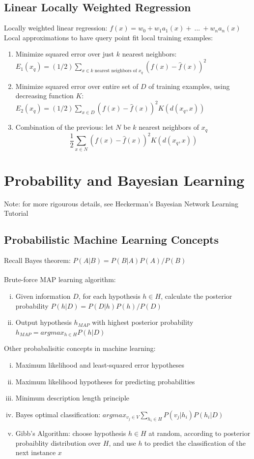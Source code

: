 \documentclass{article}
\begin{document}
		\subsection{Linear Locally Weighted Regression}
			Locally weighted linear regression: $f(x) = w_0 + w_1a_1(x) +\:...\:+ w_na_n(x)$ \\
			Local approximations to have query point fit local training examples:
			\begin{enumerate}
				\item Minimize squared error over just $k$ nearest neighbors: \\
				$E_1(x_q) = (1/2)\sum_{x \in k\text{ nearest neighbors of }x_q} (f(x) - \hat{f}(x))^2$
				\item Minimize squared error over entire set of $D$ of training examples, using decreasing function $K$: \\
				$E_2(x_q) = (1/2)\sum_{x \in D} (f(x) - \hat{f}(x))^2 K(d(x_q, x))$
				\item Combination of the previous: let $N$ be $k$ nearest neighbors of $x_q$
				\begin{equation*}
					\frac{1}{2}\sum_{x \in N} (f(x) - \hat{f}(x))^2 K(d(x_q, x))
					\end{equation*}
				\end{enumerate}
		\clearpage

	\section{Probability and Bayesian Learning}
		Note: for more rigourous details, see Heckerman's Bayesian Network Learning Tutorial
		\subsection{Probabilistic Machine Learning Concepts}
			Recall Bayes theorem: $P(A|B) = P(B|A)P(A)/P(B)$ \\
			\\
			Brute-force MAP learning algorithm:
			\begin{enumerate}[(i)]
				\item Given information $D$, for each hypothesis $h \in H$, calculate the posterior probability $P(h|D) = P(D|h)P(h)/P(D)$
				\item Output hypothesis $h_{MAP}$ with highest posterior probability $h_{MAP} = argmax_{h \in H} P(h|D)$
				\end{enumerate}
			Other probabalisitic concepts in machine learning:
			\begin{enumerate}[(i)]
				\item Maximum likelihood and least-squared error hypotheses
				\item Maximum likelihood hypotheses for predicting probabilities
				\item Minimum description length principle
				\item Bayes optimal classification: $argmax_{v_j \in V}\sum_{h_i \in H} P(v_j|h_i)P(h_i|D)$
				\item Gibb's Algorithm: choose hypothesis $h \in H$ at random, according to posterior probaiblity distribution over $H$, and use $h$ to predict the classification of the next instance $x$ 
				\end{enumerate}
\end{document}
